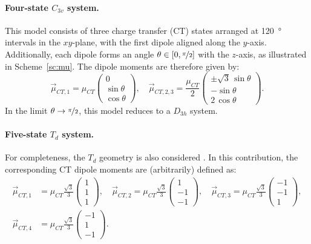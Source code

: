 \documentclass[journal=jpcafh]{achemso}
\begin{document}
\paragraph{Four-state $C_{3v}$ system.}  
This model consists of three charge transfer (CT) states arranged at \SI{120}{\degree} intervals in the $xy$-plane, with the first dipole aligned along the $y$-axis. Additionally, each dipole forms an angle $\theta \in [0, \nicefrac{\pi}{2}]$ with the $z$-axis, as illustrated in Scheme~\ref{sc:mu}. The dipole moments are therefore given by:  
\begin{equation*}
	\vec{\mu}_{CT,1} = \mu_{CT} \begin{pmatrix} 0 \\ \sin\theta \\ \cos\theta \end{pmatrix},  
	\quad  
	\vec{\mu}_{CT,2,3} = \frac{\mu_{CT}}{2} \begin{pmatrix} \pm\sqrt{3}\,\sin\theta \\ -\sin\theta \\ 2\,\cos\theta \end{pmatrix}.
\end{equation*}
In the limit  $\theta \to \nicefrac{\pi}{ 2}$, this model reduces to a $D_{3h}$ system.

\paragraph{Five-state $T_d$ system.}  
For completeness, the $T_d$ geometry is also considered \cite{choNonlinearOpticalProperties2002}. In this contribution, the corresponding CT dipole moments are (arbitrarily) defined as:  
\begin{align*}
	\vec{\mu}_{CT,1} &= \mu_{CT} \frac{\sqrt{3}}{3} \begin{pmatrix} 1 \\ 1 \\ 1 \end{pmatrix},  
	\quad  
	\vec{\mu}_{CT,2} = \mu_{CT} \frac{\sqrt{3}}{3} \begin{pmatrix} 1 \\ -1 \\ -1 \end{pmatrix}, 
	\quad
	 \vec{\mu}_{CT,3} = \mu_{CT} \frac{\sqrt{3}}{3} \begin{pmatrix} -1 \\ -1 \\ 1 \end{pmatrix},  \\
	\vec{\mu}_{CT,4} &= \mu_{CT} \frac{\sqrt{3}}{3} \begin{pmatrix} -1 \\ 1 \\ -1 \end{pmatrix}.
\end{align*}
\end{document}
